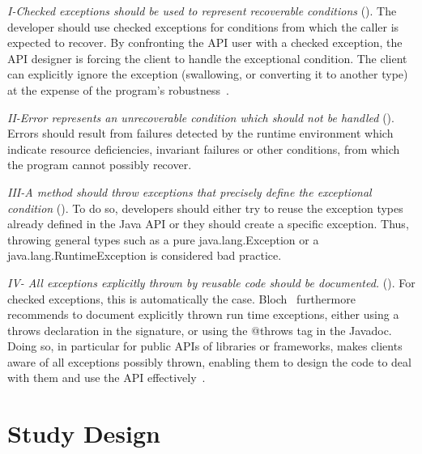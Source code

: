 
\emph{I-Checked exceptions should be used to represent recoverable
conditions} (\cite{mandrioli1992advances,gosling2000java,wirfs2006toward,bloch2008effective}).
The developer should use checked exceptions for conditions from which the caller
is expected to recover. By confronting the API user with a checked exception,
the API designer is forcing the client to handle the exceptional condition. The
client can explicitly ignore the exception (swallowing, or converting it to
another type) at the expense of the program's robustness~\cite{gosling2000java}.

\emph{II-Error represents an unrecoverable condition which should not be handled} 
(\cite{gosling2000java}).  Errors should result from failures detected
by the runtime environment which indicate resource deficiencies, invariant
failures or other conditions, from which the program cannot possibly recover.


\emph{III-A method should throw exceptions that precisely define the
exceptional condition} (\cite{gosling2000java,bloch2008effective}). To do so,
developers should either try to reuse the exception types already defined in the
Java API or they should create a specific exception. Thus, throwing general types such as a
pure java.lang.Exception or a java.lang.RuntimeException is considered bad practice.


\emph{IV- All exceptions explicitly thrown by reusable code should be documented.}
(\cite{mandrioli1992advances,gosling2000java,wirfs2006toward,bloch2008effective}).
For checked exceptions, this is automatically the case.
Bloch~\cite{bloch2008effective} furthermore recommends to document explicitly thrown
run time exceptions, either using a throws declaration in the signature, or using
the @throws tag in the Javadoc.
Doing so, in particular for public APIs of libraries or frameworks,
makes clients aware of all exceptions possibly thrown,
enabling them to design the code to deal with them and use the API effectively~\cite{Robil00,wirfs2006toward}.

\section{Study Design}
\label{sec:study}

